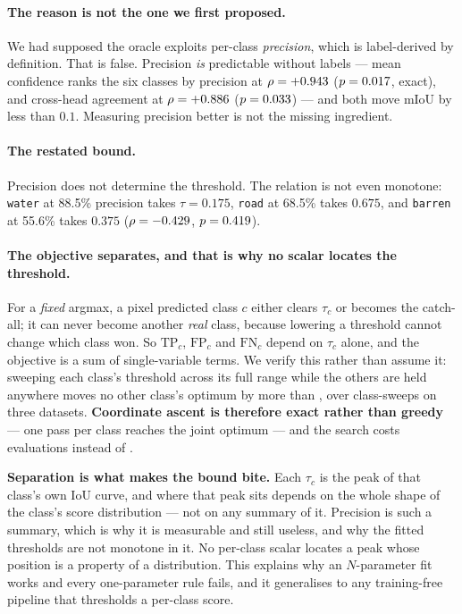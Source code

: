 \documentclass[10pt,a4paper]{article}                        %
\newcommand{\best}[1]{\textbf{#1}}
\begin{document}
\paragraph{The reason is not the one we first proposed.} We had supposed the
oracle exploits per-class \emph{precision}, which is label-derived by definition.
That is false. Precision \emph{is} predictable without labels --- mean confidence
ranks the six classes by precision at $\rho=+0.943{}$
($p=0.017{}$, exact), and cross-head agreement at $\rho=+0.886{}$
($p=0.033{}$) --- and both move mIoU by less than $0.1$. Measuring
precision better is not the missing ingredient.

\paragraph{The restated bound.} Precision does not determine the threshold. The
relation is not even monotone: \texttt{water} at 88.5\% precision
takes $\tau=0.175$, \texttt{road} at 68.5\% takes $0.675$, and
\texttt{barren} at 55.6\% takes $0.375$
($\rho=-0.429{}$, $p=0.419{}$).

\paragraph{The objective separates, and that is why no scalar locates the
threshold.} For a \emph{fixed} argmax, a pixel predicted class $c$ either clears
$\tau_c$ or becomes the catch-all; it can never become another \emph{real} class,
because lowering a threshold cannot change which class won. So $\mathrm{TP}_c$,
$\mathrm{FP}_c$ and $\mathrm{FN}_c$ depend on $\tau_c$ alone, and the objective is a
sum of single-variable terms. We verify this rather than assume it: sweeping each
class's threshold across its full range while the others are held anywhere moves
no other class's optimum by more than \sepExact{}, over \sepSweeps{} class-sweeps
on three datasets. \best{Coordinate ascent is therefore exact rather than greedy}
--- one pass per class reaches the joint optimum --- and the search costs
\sepCostA{} evaluations instead of \sepCostB{}.

\best{Separation is what makes the bound bite.} Each $\tau_c$ is the peak of that
class's own IoU curve, and where that peak sits depends on the whole shape of the
class's score distribution --- not on any summary of it. Precision is such a
summary, which is why it is measurable and still useless, and why the fitted
thresholds are not monotone in it. No per-class scalar locates a peak whose
position is a property of a distribution. This explains why an $N$-parameter fit
works and every one-parameter rule fails, and it generalises to any training-free
pipeline that thresholds a per-class score.
\end{document}
